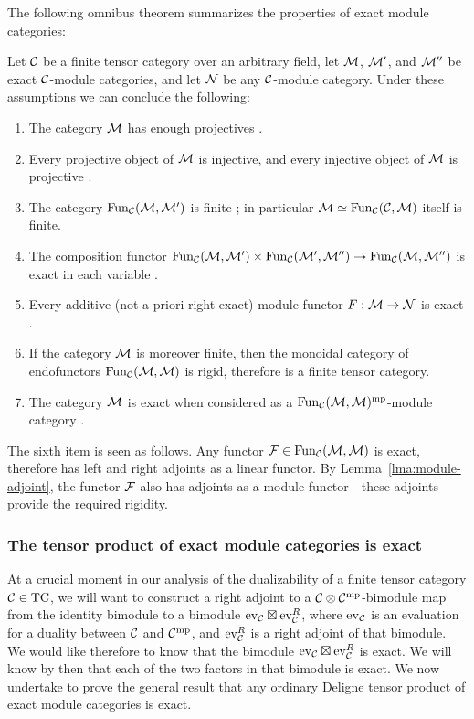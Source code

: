 \documentclass{amsart}
\begin{document}
The following omnibus theorem summarizes the properties of exact module categories: 
\begin{theorem} \label{Thm:ExactModCatOmnibus}
	Let $\mathcal C$ be a finite tensor category over an arbitrary field, let $\mathcal M$, $\mathcal M'$, and $\mathcal M''$ be exact $\mathcal C$-module categories, and let $\mathcal N$ be any $\mathcal C$-module category.  Under these assumptions we can conclude the following:
	\begin{enumerate}
		\item The category $\mathcal M$ has enough projectives \cite[Lemma 3.4]{EO-ftc} \cite[Lemma 2.7.1]{EGNO}.
		\item Every projective object of $\mathcal M$ is injective, and every injective object of $\mathcal M$ is projective \cite[Cor. 3.6]{EO-ftc} \cite[Cor 2.7.4]{EGNO}.
		\item The category $\operatorname{Fun}_{\mathcal C}(\mathcal M, \mathcal M')$ is finite \cite[Prop 2.13.5]{EGNO}; in particular $\mathcal M \simeq \operatorname{Fun}_{\mathcal C}(\mathcal C, \mathcal M)$ itself is finite. %
		\item The composition functor $\operatorname{Fun}_{\mathcal C}(\mathcal M, \mathcal M') \times \operatorname{Fun}_{\mathcal C}(\mathcal M', \mathcal M'') \to \operatorname{Fun}_{\mathcal C}(\mathcal M, \mathcal M'')$ is exact in each variable \cite[Lemma 3.20]{EO-ftc} \cite[Lemma 2.13.2]{EGNO}	.	
		\item Every additive (not a priori right exact) module functor $F:\mathcal M \to \mathcal N$ is exact \cite[Prop. 3.11]{EO-ftc} \cite[Prop 2.7.8]{EGNO}.
		\item If the category $\mathcal M$ is moreover finite, then the monoidal category of endofunctors $\operatorname{Fun}_{\mathcal C}(\mathcal M,\mathcal M)$ is rigid, therefore is a finite tensor category.
		\item The category $\mathcal M$ is exact when considered as a $\operatorname{Fun}_{\mathcal C}(\mathcal M,\mathcal M)^{\mathrm{mp}}$-module category \cite[Lemma 3.25]{EO-ftc}.
	\end{enumerate}
\end{theorem}
\nid The sixth item is seen as follows.  Any functor $\mathcal F \in \operatorname{Fun}_\mathcal C(\mathcal M,\mathcal M)$ is exact, therefore has left and right adjoints as a linear functor.  By Lemma~\ref{lma:module-adjoint}, the functor $\mathcal F$ also has adjoints as a module functor---these adjoints provide the required rigidity.  


\subsubsection{The tensor product of exact module categories is exact}

At a crucial moment in our analysis of the dualizability of a finite tensor category $\mathcal C \in \mathrm{TC}$, we will want to construct a right adjoint to a $\mathcal C \otimes \mathcal C^{\mathrm{mp}}$-bimodule map from the identity bimodule to a bimodule $\mathrm{ev}_\mathcal C \boxtimes \mathrm{ev}_\mathcal C^R$, where $\mathrm{ev}_\mathcal C$ is an evaluation for a duality between $\mathcal C$ and $\mathcal C^{\mathrm{mp}}$, and $\mathrm{ev}_\mathcal C^R$ is a right adjoint of that bimodule.  We would like therefore to know that the bimodule $\mathrm{ev}_\mathcal C \boxtimes \mathrm{ev}_\mathcal C^R$ is exact.  We will know by then that each of the two factors in that bimodule is exact.  We now undertake to prove the general result that any ordinary Deligne tensor product of exact module categories is exact.
\end{document}
